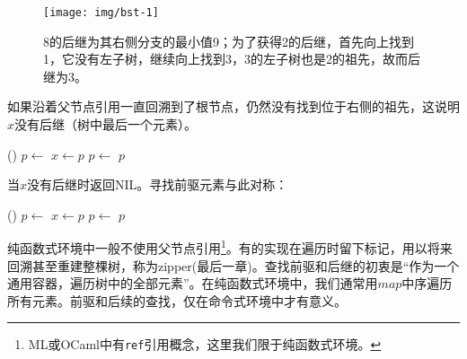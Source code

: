 \documentclass[b5paper]{ctexart}
\begin{document}
\begin{figure}[htbp]
  \centering
  \texttt{[image: img/bst-1]}
  \caption{8的后继为其右侧分支的最小值9；为了获得2的后继，首先向上找到1，它没有左子树，继续向上找到3，3的左子树也是2的祖先，故而后继为3。} \label{fig:bst-succ}
\end{figure}

如果沿着父节点引用一直回溯到了根节点，仍然没有找到位于右侧的祖先，这说明$x$没有后继（树中最后一个元素）。

\begin{algorithmic}[1]
    \State \Return {}()
  \Else
    \State $p \gets $ 
      \State $x \gets p$
      \State $p \gets $ 
    \EndWhile
    \State \Return $p$
  \EndIf
\EndFunction
\end{algorithmic}

当$x$没有后继时返回NIL。寻找前驱元素与此对称：

\begin{algorithmic}[1]
    \State \Return {}()
  \Else
    \State $p \gets $ 
      \State $x \gets p$
      \State $p \gets $ 
    \EndWhile
    \State \Return $p$
  \EndIf
\EndFunction
\end{algorithmic}

纯函数式环境中一般不使用父节点引用\footnote{ML或OCaml中有\texttt{ref}引用概念，这里我们限于纯函数式环境。}。有的实现在遍历时留下标记，用以将来回溯甚至重建整棵树，称为zipper(\cite{learn-haskell}最后一章)。查找前驱和后继的初衷是“作为一个通用容器，遍历树中的全部元素”。在纯函数式环境中，我们通常用$map$中序遍历所有元素。前驱和后续的查找，仅在命令式环境中才有意义。

\begin{Exercise}


\end{Exercise}
\end{document}
